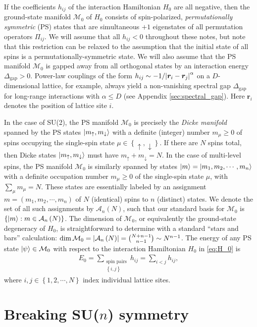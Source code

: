 \documentclass[nofootinbib,notitlepage,11pt]{revtex4-2}
\renewcommand{\t}{\text} %
\newcommand{\p}[1]{\left(#1\right)} %
\renewcommand{\set}[1]{\left\{#1\right\}} %
\newcommand{\m}{\bm} %
\newcommand{\1}{\mathds{1}}
\newcommand{\up}{\uparrow}
\newcommand{\dn}{\downarrow}
\newcommand{\A}{\mathcal{A}}
\newcommand{\M}{\mathcal{M}}
\begin{document}
If the coefficients $h_{ij}$ of the interaction Hamiltonian $H_0$ are
all negative, then the ground-state manifold $\M_0$ of $H_0$ consists
of spin-polarized, {\it permutationally symmetric} (PS) states that
are simultaneous $+1$ eigenstates of all permutation operators
$\Pi_{ij}$.  We will assume that all $h_{ij}<0$ throughout these
notes, but note that this restriction can be relaxed to the assumption
that the initial state of all spins is a permutationally-symmetric
state.  We will also assume that the PS manifold $\M_0$ is gapped away
from all orthogonal states by an interaction energy
$\Delta_{\t{gap}}>0$.  Power-law couplings of the form
$h_{ij}\sim-1/\abs{\m r_i-\m r_j}^\alpha$ on a $D$-dimensional
lattice, for example, always yield a non-vanishing spectral gap
$\Delta_{\t{gap}}$ for long-range interactions with $\alpha\le D$ (see
Appendix \ref{sec:spectral_gap}).  Here $\m r_i$ denotes the position
of lattice site $i$.

In the case of SU(2), the PS manifold $\M_0$ is precisely the {\it
  Dicke manifold} spanned by the PS states $\ket{m_\up,m_\dn}$ with a
definite (integer) number $m_\mu\ge0$ of spins occupying the
single-spin state $\mu\in\set{\up,\dn}$.  If there are $N$ spins
total, then Dicke states $\ket{m_\up,m_\dn}$ must have
$m_\up+m_\dn=N$.  In the case of multi-level spins, the PS manifold
$\M_0$ is similarly spanned by states
$\ket{m}=\ket{m_1,m_2,\cdots,m_n}$ with a definite occupation number
$m_\mu\ge0$ of the single-spin state $\mu$, with $\sum_\mu m_\mu=N$.
These states are essentially labeled by an assignment
$m=\p{m_1,m_2,\cdots,m_n}$ of $N$ (identical) spins to $n$ (distinct)
states.  We denote the set of all such assignments by $\A_n\p{N}$,
such that our standard basis for $\M_0$ is
$\set{\ket{m}:m\in\A_n\p{N}}$.  The dimension of $\M_0$, or
equivalently the ground-state degeneracy of $H_0$, is straightforward
to determine with a standard ``stars and bars'' calculation:
$\dim\M_0=\abs{\A_n\p{N}} = {N+n-1 \choose n-1} \sim N^{n-1}$.  The
energy of any PS state $\ket\psi\in\M_0$ with respect to the
interaction Hamiltonian $H_0$ in \eqref{eq:H_0} is
\begin{align}
  E_0 = \sum_{\substack{\t{spin pairs}\\\set{i,j}}} h_{ij}
  = \sum_{i<j} h_{ij},
\end{align}
where $i,j\in\set{1,2,\cdots,N}$ index individual lattice sites.

\section{Breaking SU($n$) symmetry}
\label{sec:breaking_sun}
\end{document}
